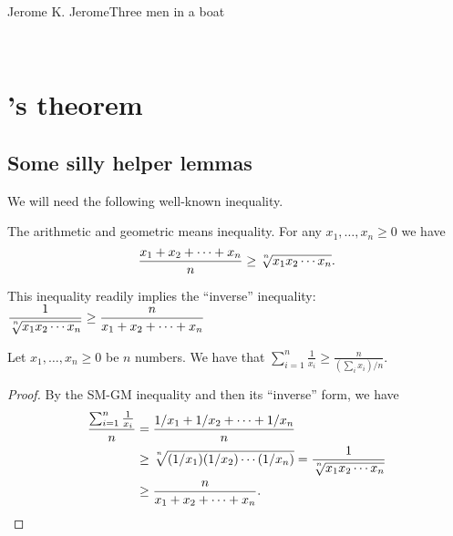 
%


%
{Jerome K. Jerome}{Three men in a boat}


\noindent%
\ChapterPrefix{}%
\ChapterGen{}

~


\bigskip%







\section{\Turan's theorem}

\subsection{Some silly helper lemmas}
We will need the following well-known inequality.

\begin{lemma}[AM-GM inequality]
    The arithmetic and geometric means inequality.
    For any $x_1, \ldots, x_n \geq 0$ we have
    \[
    \frac{x_1 + x_2 + \cdots + x_n}{n} \geq
    \sqrt[\uproot{4}n]{x_1 x_2 \cdots x_n}.
    \]
\end{lemma}
This inequality readily implies the ``inverse'' inequality:
\begin{math}
    \ds \frac{1}{ \sqrt[\uproot{4}n]{x_1 x_2 \cdots x_n}} \geq
    \frac{n}{x_1 + x_2 + \cdots + x_n}
\end{math}

\begin{lemma}
    Let $x_1, \ldots, x_n \geq 0$ be $n$ numbers. We have that
    \begin{math}
        \sum_{i=1}^n \frac{1}{x_i} \geq \frac{n}{(\sum_i x_i)/n}.
    \end{math}
\end{lemma}
\begin{proof}
    By the SM-GM inequality and then its ``inverse'' form, we have
    \begin{align*}
        \frac{\sum_{i=1}^n \frac{1}{x_i}}{n}
        &=
        \frac{1/x_1 + 1/x_2 + \cdots + 1/x_n}{n}\\
        &\geq
        \sqrt[\uproot{4}n]{(1/x_1) (1/x_2) \cdots (1/x_n)}
        =
        \frac{1}{
           \sqrt[\uproot{4}n]{x_1 x_2 \cdots x_n}}\\
        &\geq
        \frac{n}{x_1 + x_2 + \cdots + x_n}.
    \end{align*}
\end{proof}

